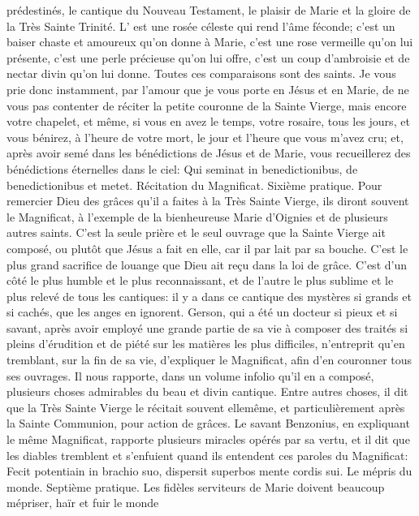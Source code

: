 prédestinés, le cantique du Nouveau Testament, le plaisir de Marie et la gloire de la Très Sainte Trinité. L' est une rosée céleste qui rend l'âme féconde; c'est un baiser chaste et amoureux qu'on donne à Marie, c'est
une rose vermeille qu'on lui présente, c'est une perle précieuse qu'on lui offre, c'est un coup d'ambroisie et de
nectar divin qu'on lui donne. Toutes ces comparaisons sont des saints.
 Je vous prie donc instamment, par l'amour que je vous porte en Jésus et en Marie, de ne vous pas contenter
de réciter la petite couronne de la Sainte Vierge, mais encore votre chapelet, et même, si vous en avez le temps,
votre rosaire, tous les jours, et vous bénirez, à l'heure de votre mort, le jour et l'heure que vous m'avez cru; et,
après avoir semé dans les bénédictions de Jésus et de Marie, vous recueillerez des bénédictions éternelles dans
le ciel: Qui seminat in benedictionibus, de benedictionibus et metet.
Récitation du Magnificat.
 Sixième pratique. Pour remercier Dieu des grâces qu'il a faites à la Très Sainte Vierge, ils diront souvent le
Magnificat, à l'exemple de la bienheureuse Marie d'Oignies et de plusieurs autres saints. C'est la seule prière et le
seul ouvrage que la Sainte Vierge ait composé, ou plutôt que Jésus a fait en elle, car il par lait par sa bouche.
C'est le plus grand sacrifice de louange que Dieu ait reçu dans la loi de grâce. C'est d'un côté le plus humble et le
plus reconnaissant, et de l'autre le plus sublime et le plus relevé de tous les cantiques: il y a dans ce cantique des
mystères si grands et si cachés, que les anges en ignorent. Gerson, qui a été un docteur si pieux et si savant,
après avoir employé une grande partie de sa vie à composer des traités si pleins d'érudition et de piété sur les
matières les plus difficiles, n'entreprit qu'en tremblant, sur la fin de sa vie, d'expliquer le Magnificat, afin d'en
couronner tous ses ouvrages. Il nous rapporte, dans un volume infolio qu'il en a composé, plusieurs choses
admirables du beau et divin cantique. Entre autres choses, il dit que la Très Sainte Vierge le récitait souvent ellemême, et particulièrement après la Sainte Communion, pour action de grâces. Le savant Benzonius, en expliquant
le même Magnificat, rapporte plusieurs miracles opérés par sa vertu, et il dit que les diables tremblent et s'enfuient
quand ils entendent ces paroles du Magnificat: Fecit potentiain in brachio suo, dispersit superbos mente cordis sui.
Le mépris du monde.
 Septième pratique. Les fidèles serviteurs de Marie doivent beaucoup mépriser, haïr et fuir le monde

